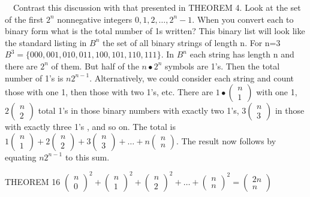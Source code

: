 \documentclass{article}
\begin{document}
\ \ Contrast this discussion with that presented in THEOREM 4.  Look at the set of the first  $2^n$ nonnegative integers
$0,1,2,{\dots},2^n-1$. When you convert each to binary form what is the total number of 1s written?  This binary list
will look like the standard listing in  $B^n$ the set of all binary strings of length  n.  For n=3 
$B^3=\{000,001,010,011,100,101,110,111\}$. In  $B^n$ each string has length  n  and there are  $2^n$ of them.  But half
of the  $n{\bullet}2^n$ symbols are 1’s.  Then the total number of 1’s is  $n2^{n-1}$.  Alternatively, we could
consider each string and count those with one 1, then those with two 1’s, etc.  There are 
$1{\bullet}\left(\begin{matrix}n\\1\end{matrix}\right)$ with one 1,  $2\left(\begin{matrix}n\\2\end{matrix}\right)$
total 1’s in those binary numbers with exactly two 1’s,  $3\left(\begin{matrix}n\\3\end{matrix}\right)$ in those with
exactly three 1’s , and so on.  The total is 
$1\left(\begin{matrix}n\\1\end{matrix}\right)+2\left(\begin{matrix}n\\2\end{matrix}\right)+3\left(\begin{matrix}n\\3\end{matrix}\right)+{\dots}+n\left(\begin{matrix}n\\n\end{matrix}\right).$
The result now follows by equating  $n2^{n-1}$ to this sum.

THEOREM 16  
$\left(\begin{matrix}n\\0\end{matrix}\right)^2+\left(\begin{matrix}n\\1\end{matrix}\right)^2+\left(\begin{matrix}n\\2\end{matrix}\right)^2+{\dots}+\left(\begin{matrix}n\\n\end{matrix}\right)^2=\left(\begin{matrix}2n\\n\end{matrix}\right)$
\end{document}
